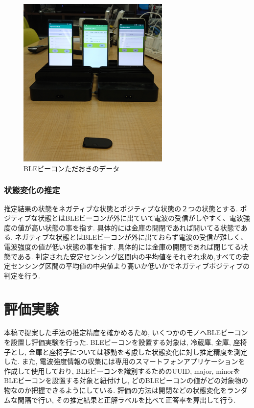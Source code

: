 \documentclass[Japanese]{dicomopapers}
\begin{document}
\begin{figure}[ht]
 \centering
 \includegraphics[width=7.5cm]{compare.jpg}
 \caption{BLEビーコンただおきのデータ}
 \label{compare}
\end{figure}


\subsubsection{状態変化の推定}
推定結果の状態をネガティブな状態とポジティブな状態の２つの状態とする.
ポジティブな状態とはBLEビーコンが外に出ていて電波の受信がしやすく、電波強度の値が高い状態の事を指す. 具体的には金庫の開閉であれば開いてる状態である.
ネガティブな状態とはBLEビーコンが外に出ておらず電波の受信が難しく、電波強度の値が低い状態の事を指す. 具体的には金庫の開閉であれば閉じてる状態である.
判定された安定センシング区間内の平均値をそれぞれ求め,すべての安定センシング区間の平均値の中央値より高いか低いかでネガティブポジティブの判定を行う.





\section{評価実験}

本稿で提案した手法の推定精度を確かめるため, いくつかのモノへBLEビーコンを設置し評価実験を行った.
BLEビーコンを設置する対象は, 冷蔵庫, 金庫, 座椅子とし, 金庫と座椅子については移動を考慮した状態変化に対し推定精度を測定した.
また, 電波強度情報の収集には専用のスマートフォンアプリケーションを作成して使用しており, BLEビーコンを識別するためのUUID, major, minorをBLEビーコンを設置する対象と紐付けし, どのBLEビーコンの値がどの対象物の物なのか把握できるようにしている.
評価の方法は開閉などの状態変化をランダムな間隔で行い, その推定結果と正解ラベルを比べて正答率を算出して行う.
\end{document}
